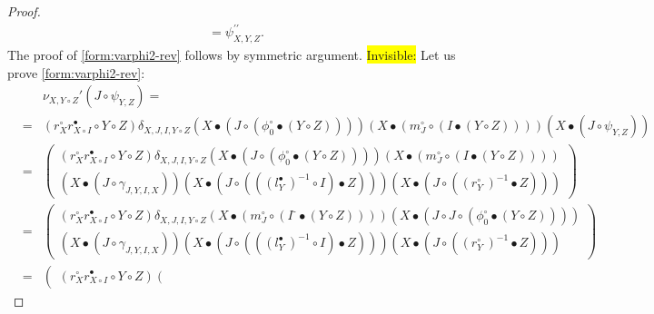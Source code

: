 \documentclass[nosumlimits,twoside]{amsart}
\theoremstyle{definition}
\theoremstyle{remark}
\def\revsn{\text{-}}
\newenvironment{invisible}{{\noindent\sc \colorbox{yellow}{Invisible:}\;}\color{gray}}{\medskip}
\begin{document}
\begin{proof}
\begin{eqnarray*}
=\psi _{X,Y,Z}^{\prime \prime }.
\end{eqnarray*}
The proof of \eqref{form:varphi2-rev} follows by symmetric argument.
\begin{invisible}
Let us prove \eqref{form:varphi2-rev}:%
\begin{eqnarray*}
&&\nu_{X,Y\circ Z}'\left( J\circ \psi _{Y,Z}\right)=\\&=&\left( r_{X}^{\circ }r_{X\circ I}^{\bullet }\circ Y\circ Z\right) \delta
_{X,J,I,Y\circ Z}\left( X\bullet \left( J\circ \left( \phi^\circ _{0}\bullet
\left( Y\circ Z\right) \right) \right) \right) \left( X\bullet \left(
m_{J}^{\circ }\circ \left( I\bullet \left( Y\circ Z\right) \right) \right)
\right) \left( X\bullet \left( J\circ \psi _{Y,Z}\right) \right)  \\
&=&\left(
\begin{array}{c}
\left( r_{X}^{\circ }r_{X\circ I}^{\bullet }\circ Y\circ Z\right) \delta
_{X,J,I,Y\circ Z}\left( X\bullet \left( J\circ \left( \phi^\circ _{0}\bullet
\left( Y\circ Z\right) \right) \right) \right) \left( X\bullet \left(
m_{J}^{\circ }\circ \left( I\bullet \left( Y\circ Z\right) \right) \right)
\right)  \\
\left( X\bullet \left( J\circ \gamma _{J,Y,I,X}\right) \right) \left(
X\bullet \left( J\circ \left( \left( \left( l_{Y^{\revsn }}^{\bullet }\right)
^{-1}\circ I\right) \bullet Z\right) \right) \right) \left( X\bullet \left(
J\circ \left( \left( r_{Y^{\revsn }}^{\circ }\right) ^{-1}\bullet Z\right)
\right) \right)
\end{array}%
\right)  \\
&=&\left(
\begin{array}{c}
\left( r_{X}^{\circ }r_{X\circ I}^{\bullet }\circ Y\circ Z\right) \delta
_{X,J,I,Y\circ Z}\left( X\bullet \left( m_{J}^{\circ }\circ \left( I^{\revsn
}\bullet \left( Y\circ Z\right) \right) \right) \right) \left( X\bullet
\left( J\circ J\circ \left( \phi^\circ _{0}\bullet \left( Y\circ Z\right) \right)
\right) \right)  \\
\left( X\bullet \left( J\circ \gamma _{J,Y,I,X}\right) \right) \left(
X\bullet \left( J\circ \left( \left( \left( l_{Y^{\revsn }}^{\bullet }\right)
^{-1}\circ I\right) \bullet Z\right) \right) \right) \left( X\bullet \left(
J\circ \left( \left( r_{Y^{\revsn }}^{\circ }\right) ^{-1}\bullet Z\right)
\right) \right)
\end{array}%
\right)  \\
&=&\left(
\begin{array}{c}
\left( r_{X}^{\circ }r_{X\circ I}^{\bullet }\circ Y\circ Z\right) \left(

\end{array}
\end{eqnarray*}
\end{invisible}
\end{proof}
\end{document}
